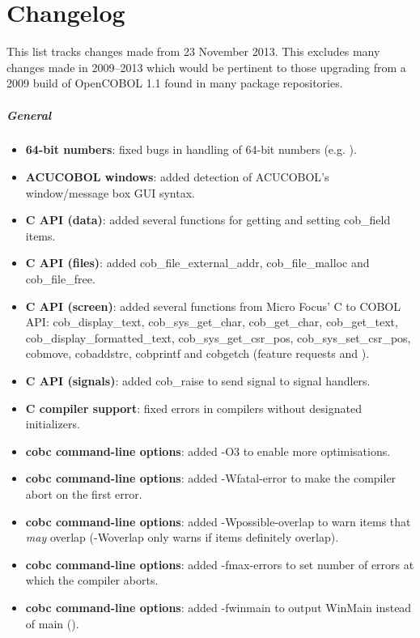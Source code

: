 \chapter{Changelog}

This list tracks changes made from 23 November 2013. This excludes many changes made in 2009--2013 which would be pertinent to those upgrading from a 2009 build of OpenCOBOL 1.1 found in many package repositories.

\paragraph{General}
\begin{itemize}
\item \textbf{64-bit numbers}: fixed bugs in handling of 64-bit numbers (e.g. ).
\item \textbf{ACUCOBOL windows}: added detection of ACUCOBOL's window\slash{}message box GUI syntax.
\item \textbf{C API (data)}: added several functions for getting and setting cob\_field items.
\item \textbf{C API (files)}: added cob\_file\_external\_addr, cob\_file\_malloc and cob\_file\_free.
\item \textbf{C API (screen)}: added several functions from Micro Focus' C to COBOL API: cob\_display\_text, cob\_sys\_get\_char, cob\_get\_char, cob\_get\_text, cob\_display\_formatted\_text, cob\_sys\_get\_csr\_pos, cob\_sys\_set\_csr\_pos, cobmove, cobaddstrc, cobprintf and cobgetch (feature requests  and ).
\item \textbf{C API (signals)}: added cob\_raise to send signal to signal handlers.
\item \textbf{C compiler support}: fixed errors in compilers without designated initializers.
\item \textbf{cobc command-line options}: added -O3 to enable more optimisations.
\item \textbf{cobc command-line options}: added -Wfatal-error to make the compiler abort on the first error.
\item \textbf{cobc command-line options}: added -Wpossible-overlap to warn items that \emph{may} overlap (-Woverlap only warns if items definitely overlap).
\item \textbf{cobc command-line options}: added -fmax-errors to set number of errors at which the compiler aborts.
\item \textbf{cobc command-line options}: added -fwinmain to output WinMain instead of main ().

\end{itemize}
